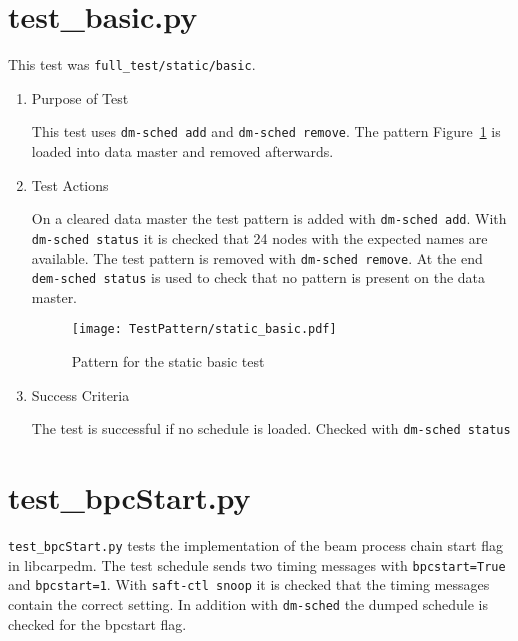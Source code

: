 \documentclass[12pt,a4paper]{report}
\begin{document}
\section{test\_basic.py}
This test was \texttt{full\_test/static/basic}.
\begin{enumerate}
	\item Purpose of Test

	This test uses \texttt{dm-sched add} and \texttt{dm-sched remove}. The pattern Figure~\ref{fig:Pattern_for_the_static_basic_test}
	is loaded into data master and removed afterwards.

	\item Test Actions

	On a cleared data master the test pattern is added with \texttt{dm-sched add}. With \texttt{dm-sched status} it is checked
	that 24 nodes with the expected names are available. The test pattern is removed with \texttt{dm-sched remove}. At the
	end \texttt{dem-sched status} is used to check that no pattern is present on the data master.

    \begin{figure}
        \centering
        \texttt{[image: TestPattern/static\_basic.pdf]}
        \caption{Pattern for the static basic test}
        \label{fig:Pattern_for_the_static_basic_test}
    \end{figure}
	\item Success Criteria

	The test is successful if no schedule is loaded. Checked with \texttt{dm-sched status}
\end{enumerate}

\section{test\_bpcStart.py}
\texttt{test\_bpcStart.py} tests the implementation of the beam process chain start flag in libcarpedm.
The test schedule sends two timing messages with \texttt{bpcstart=True} and \texttt{bpcstart=1}.
With \texttt{saft-ctl snoop} it is checked that the timing messages contain the correct setting.
In addition with \texttt{dm-sched} the dumped schedule is checked for the bpcstart flag.
\end{document}
